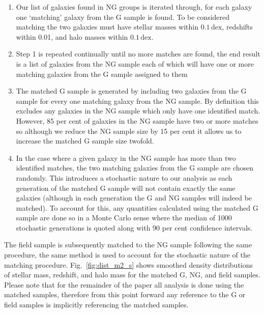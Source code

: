 \documentclass[a4paper,fleqn,usenatbib]{mnras}
\begin{document}
\begin{enumerate}
  \item Our list of galaxies found in NG groups is iterated through,
    for each galaxy one `matching' galaxy from the G sample is
    found.  To be considered matching the two galaxies must have
    stellar masses within $0.1\,\mathrm{dex}$, redshifts within 0.01,
    and halo masses within $0.1\,\mathrm{dex}$.

  \item Step 1 is repeated continually until no more matches are
    found, the end result is a list of galaxies from the NG
    sample each of which will have one or more matching galaxies from
    the G sample assigned to them
  
  \item The matched G sample is generated by including two galaxies
    from the G sample for every one matching galaxy from the NG
    sample.  By definition this excludes any galaxies in the NG
    sample which only have one identified match.  However, 85 per cent
    of galaxies
    in the NG sample have two or more matches so although we reduce
    the NG sample size by 15 per cent it allows us to increase the
    matched G sample size twofold.

  \item In the case where a given galaxy in the NG sample has more
    than two identified matches, the two matching galaxies from the G sample are
    chosen randomly.  This introduces a stochastic nature to our
    analysis as each generation of the matched G sample will not
    contain exactly the same galaxies (although in each generation the
    G and NG samples will indeed be matched).  To account for this, any
    quantities calculated using the matched G sample are done so in a
    Monte Carlo sense where the median of 1000 stochastic generations
    is quoted along with 90 per cent confidence intervals.
\end{enumerate}

\noindent
The field sample is subsequently matched to the NG sample following
the same procedure, the same method is used to account for the
stochastic nature of the matching procedure.  Fig.~\ref{fig:dist_m2_s}
shows smoothed density
distributions of stellar mass, redshift, and halo mass for the matched
G, NG, and field samples.  Please note that for the remainder of the
paper all analysis is done using the matched samples, therefore from
this point forward any reference to the G or field samples is
implicitly referencing the matched samples.
\end{document}
